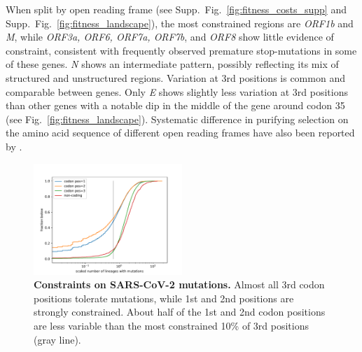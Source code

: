 \documentclass[aps,rmp, twocolumn]{revtex4}
\begin{document}
When split by open reading frame (see Supp.~Fig.~\ref{fig:fitness_costs_supp} and Supp.~Fig.~\ref{fig:fitness_landscape}), the most constrained regions are \emph{ORF1b} and \emph{M}, while \emph{ORF3a, ORF6, ORF7a, ORF7b}, and \emph{ORF8} show little evidence of constraint, consistent with frequently observed premature stop-mutations in some of these genes.
\emph{N} shows an intermediate pattern, possibly reflecting its mix of structured and unstructured regions.
Variation at 3rd positions is common and comparable between genes.
Only \emph{E} shows slightly less variation at 3rd positions than other genes with a notable dip in the middle of the gene around codon 35 (see Fig.~\ref{fig:fitness_landscape}).
Systematic difference in purifying selection on the amino acid sequence of different open reading frames have also been reported by \citet{rochman_ongoing_2021}.



\begin{figure}
    \includegraphics[width=0.5\textwidth]{figures/fitness_cost.pdf}
    \caption{{\bf Constraints on SARS-CoV-2 mutations.}
    Almost all 3rd codon positions tolerate mutations, while 1st and 2nd positions are strongly constrained.
    About half of the 1st and 2nd codon positions are less variable than the most constrained 10\% of 3rd positions (gray line).
    \label{fig:fitness_costs}}
 \end{figure}
\end{document}
